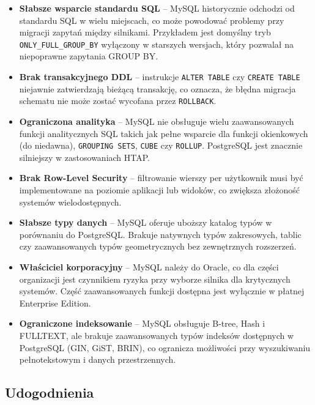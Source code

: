 \begin{itemize}
    \item \textbf{Słabsze wsparcie standardu SQL} -- MySQL historycznie
    odchodzi od standardu SQL w wielu miejscach, co może powodować
    problemy przy migracji zapytań między silnikami. Przykładem jest
    domyślny tryb \texttt{ONLY\_FULL\_GROUP\_BY} wyłączony w starszych
    wersjach, który pozwalał na niepoprawne zapytania GROUP BY.
    \item \textbf{Brak transakcyjnego DDL} -- instrukcje \texttt{ALTER TABLE}
    czy \texttt{CREATE TABLE} niejawnie zatwierdzają bieżącą transakcję,
    co oznacza, że błędna migracja schematu nie może zostać wycofana
    przez \texttt{ROLLBACK}.
    \item \textbf{Ograniczona analityka} -- MySQL nie obsługuje wielu
    zaawansowanych funkcji analitycznych SQL takich jak pełne wsparcie
    dla funkcji okienkowych (do niedawna), \texttt{GROUPING SETS},
    \texttt{CUBE} czy \texttt{ROLLUP}. PostgreSQL jest znacznie silniejszy
    w zastosowaniach HTAP.
    \item \textbf{Brak Row-Level Security} -- filtrowanie wierszy per
    użytkownik musi być implementowane na poziomie aplikacji lub widoków,
    co zwiększa złożoność systemów wielodostępnych.
    \item \textbf{Słabsze typy danych} -- MySQL oferuje uboższy katalog
    typów w porównaniu do PostgreSQL. Brakuje natywnych typów zakresowych,
    tablic czy zaawansowanych typów geometrycznych bez zewnętrznych rozszerzeń.
    \item \textbf{Właściciel korporacyjny} -- MySQL należy do Oracle,
    co dla części organizacji jest czynnikiem ryzyka przy wyborze silnika
    dla krytycznych systemów. Część zaawansowanych funkcji dostępna jest
    wyłącznie w płatnej Enterprise Edition.
    \item \textbf{Ograniczone indeksowanie} -- MySQL obsługuje B-tree,
    Hash i FULLTEXT, ale brakuje zaawansowanych typów indeksów dostępnych
    w PostgreSQL (GIN, GiST, BRIN), co ogranicza możliwości przy
    wyszukiwaniu pełnotekstowym i danych przestrzennych.
\end{itemize}

\subsection{Udogodnienia}

